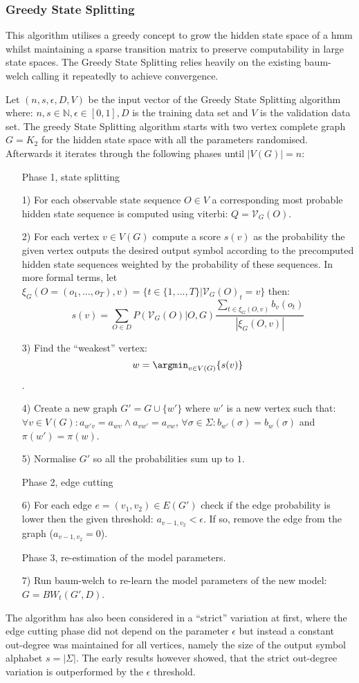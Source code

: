 \subsubsection{Greedy State Splitting}

This algorithm utilises a greedy concept to grow the hidden state space of a \gls{hmm} whilst maintaining a sparse transition matrix to preserve computability in large state spaces. The Greedy State Splitting relies heavily on the existing \gls{baum-welch} calling it repeatedly to achieve convergence.

Let $(n, s, \epsilon, D, V)$ be the input vector of the Greedy State Splitting algorithm where: $n, s \in \mathbb{N}, \epsilon\in[0,1], D$ is the training data set and $V$ is the validation data set. The greedy State Splitting algorithm starts with two vertex complete graph $G=K_2$ for the hidden state space with all the parameters randomised. Afterwards it iterates through the following phases until $|V(G)| = n$:

\begin{itemize}
	\item[] Phase 1, state splitting
	\item[1)] For each observable state sequence $O \in V$ a corresponding most probable hidden state sequence is computed using \gls{viterbi}: $Q=\mathcal{V}_G(O)$.
	\item[2)] For each vertex $v \in V(G)$ compute a score $s(v)$ as the probability the given vertex outputs the desired output symbol according to the precomputed hidden state sequences weighted by the probability of these sequences. In more formal terms, let $\xi_G(O=(o_1,...,o_T), v) = \{t\in\{1, ..., T\}|\mathcal{V}_G(O)_t=v\}$ then: $$s(v) = \sum_{O\in D}P(\mathcal{V}_G(O)|O,G) \frac{\sum_{t \in \xi_G(O, v)}b_v(o_t)}{|\xi_G(O, v)|}$$
	\item[3)] Find the ``weakest'' vertex: $$w = \argmin_{v\in V(G)}\{s(v)\}$$.
	\item[4)] Create a new graph $G' = G\cup \{w'\}$ where $w'$ is a new vertex such that: $\forall v\in V(G): a_{w'v} = a_{wv} \land a_{vw'} = a_{vw}$, $\forall \sigma \in \Sigma: b_{w'}(\sigma) = b_w(\sigma)$ and $\pi(w') = \pi(w)$.
	\item[5)] Normalise $G'$ so all the probabilities sum up to $1$.
	\item[] Phase 2, edge cutting
	\item[6)] For each edge $e = (v_1,v_2)\in E(G')$ check if the edge probability is lower then the given threshold: $a_{v-1,v_2}<\epsilon$. If so, remove the edge from the graph ($a_{v-1,v_2} = 0$).
	\item[] Phase 3, re-estimation of the model parameters.
	\item[7)] Run \gls{baum-welch} to re-learn the model parameters of the new model: $G = BW_t(G', D)$.
\end{itemize}

The algorithm has also been considered in a ``strict'' variation at first, where the edge cutting phase did not depend on the parameter $\epsilon$ but instead a constant out-degree was maintained for all vertices, namely the size of the output symbol alphabet $s = |\Sigma|$. The early results however showed, that the strict out-degree variation is outperformed by the $\epsilon$ threshold.